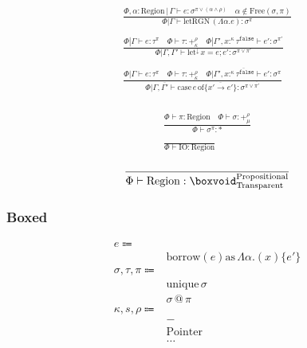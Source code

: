 \documentclass {article}
\begin{document}
\begin{gather*}
\frac
{\Phi , \alpha : \text{Region} \, | \, \Gamma \vdash e : \sigma^{\pi \lor (\alpha \land \rho)} \quad \alpha \notin \text{Free}(\sigma, \pi)}
{\Phi | \Gamma \vdash \text{letRGN} \, (\Lambda \alpha. e) : \sigma^\pi} \\
\\
\frac
{\Phi | \Gamma \vdash e : \tau^\pi \quad \Phi \vdash \tau : +^{\rho}_{\kappa} \quad \Phi | \Gamma', x :^{\kappa} \tau^\texttt{false} \vdash e' : \sigma^{\pi'}}
{\Phi | \Gamma, \Gamma' \vdash \text{let}^\downarrow \, x = e; e' : \sigma^{\pi \lor \pi'}} \\
\\
\frac
{\Phi | \Gamma \vdash e : \tau^\pi \quad \Phi \vdash \tau : +^{\rho}_{\kappa} \quad \overline{ \Phi | \Gamma', x :^{\kappa} \tau^\texttt{false} \vdash e' : \sigma^\pi }}
{\Phi | \Gamma, \overline {\Gamma'} \vdash \text{case} \, e \, \text{of} \{ \overline {x' \to  e' } \} : \sigma^{\pi \lor \overline{\pi'}}} \\
\end{gather*}

\begin{gather*}
\frac
{\Phi \vdash \pi : \text{Region} \quad \Phi \vdash \sigma : +^\rho_\mu}
{\Phi \vdash \sigma^\pi : *} \\
\\
\frac
{}
{\Phi \vdash \text{IO} : \text{Region}}
\end{gather*}

\begin{gather*}
\frac
{}
{\Phi \vdash \text{Region} : \boxvoid^{\text{Propositional}}_{\text{Transparent}}} \\
\end{gather*}

\subsubsection{Boxed}
\begin{align*}
e \Coloneqq & \\
& \text{borrow} (e) \text{as} \, \Lambda \alpha. (x) \{ e' \} \\
\sigma, \tau, \pi \Coloneqq & \\
& \text{unique} \, \sigma \\
& \sigma \, @ \, \pi \\
\kappa, s, \rho \Coloneqq & \\
& - \tag{Boxed} \\
& \text{Pointer} \tag{Pointer Representation} \\
& \dots \\
\end{align*}
\end{document}
